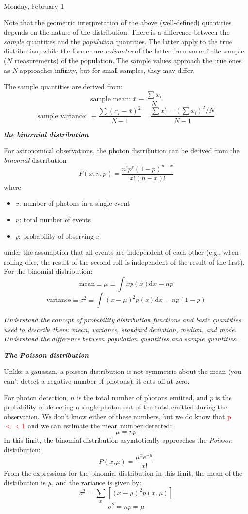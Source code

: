 \documentclass[12pt]{article}
\begin{document}
\textcolor{date}{Monday, February 1}

Note that the geometric interpretation of the above (well-defined)
quantities depends on the nature of the distribution.
There is a difference between the \emph{sample} quantities
and the \emph{population} quantities. The latter apply
to the true distribution, while the former are \emph{estimates} of the latter
from some finite sample ($N$ measurements) of the population.
The sample values approach the true ones as $N$
approaches infinity, but for small samples, they may differ.

The sample quantities are derived from:
$$\textrm{sample\ mean:\ } \bar{x} \equiv \frac{\sum x_i}{N}$$
$$\textrm{sample\ variance:\ } \equiv
  \frac{\sum (x_i-\bar{x})^2}{N-1} =
  \frac{\sum x_i^2-(\sum x_i)^2/N}{N-1}$$

\textbf{\emph{the binomial distribution}}

For astronomical observations, the photon distribution can be derived from the
\emph{binomial} distribution:
   $$ P(x,n,p) = \frac{n!p^x(1-p)^{n-x}}{x!(n-x)!}  $$
where
\begin{itemize}
    \item $x$: number of photons in a single event
    \item $n$: total number of events
    \item $p$: probability of observing $x$
\end{itemize}
under the assumption that all events are independent of each other
(e.g., when rolling dice, the result of the second roll is independent
of the result of the first). For the binomial distribution:
   $$ \textrm{mean} \equiv \mu \equiv \int xp(x)\textrm{d}x = np $$
   $$ \textrm{variance} \equiv \sigma^2 \equiv
      \int (x-\mu)^2p(x)\textrm{d}x = np(1-p) $$

\textcolor{om}{\emph{Understand the concept of probability
distribution functions and basic quantities used to describe them:
mean, variance, standard deviation, median, and mode. Understand the
difference between population quantities and sample quantities.}}

\textbf{\emph{The Poisson distribution}}

Unlike a gaussian, a poisson distribution is not
symmetric about the mean (you can't detect a negative number of
photons); it cuts off at zero.

For photon detection, $n$ is the total number of
photons emitted, and $p$ is the probability of detecting a
single photon out of the total emitted during the observation.
We don't know either of these numbers, but we do know that
\textcolor{red}{p$<<$1} and we can estimate the mean number detected:
  $$  \mu = np $$
In this limit, the binomial distribution asymtotically approaches the
\emph{Poisson} distribution:
   $$  P(x,\mu) = \frac{\mu^x e^{-\mu}}{x!} $$
From the expressions for the binomial distribution in this limit, the
mean of the distribution is $\mu$, and the variance is given by:
  $$  \sigma^{2} = \sum_x [(x-\mu)^2p(x,\mu)] $$
  $$  \sigma^{2} = np = \mu  $$
\end{document}
